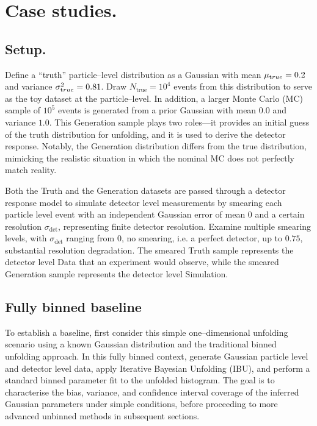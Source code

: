 \section{Case studies.}
\label{sec:case-studies}
    \subsection{Setup.}
    \label{subsec:setup}
        Define a ``truth'' particle--level distribution as a Gaussian with mean $\mu_{\text true}=0.2$ and variance $\sigma^2_{\text true}=0.81$.
        Draw $N_{\text{true}}=10^4$ events from this distribution to serve as the toy dataset at the particle--level.
        In addition, a larger Monte Carlo (MC) sample of $10^5$ events is generated from a prior Gaussian with mean \(0.0\) and variance \(1.0.\)
        This Generation sample plays two roles---it provides an initial guess of the truth distribution for unfolding, and it is used to derive the detector response.
        Notably, the Generation distribution differs from the true distribution, mimicking the realistic situation in which the nominal MC does not perfectly match reality.

        Both the Truth and the Generation datasets are passed through a detector response model to simulate detector level measurements by smearing each particle level event with an independent Gaussian error of mean 0 and a certain resolution $\sigma_{\text{det}}$, representing finite detector resolution.
        Examine multiple smearing levels, with $\sigma_{\text{det}}$ ranging from \(0\), no smearing, i.e. a perfect detector, up to \(0.75\), substantial resolution degradation.
        The smeared Truth sample represents the detector level Data that an experiment would observe, while the smeared Generation sample represents the detector level Simulation.
        
    \subsection{Fully binned baseline}
    \label{subsec:fully_binned_demo}
        To establish a baseline, first consider this simple one--dimensional unfolding scenario using a known Gaussian distribution and the traditional binned unfolding approach.
        In this fully binned context, generate Gaussian particle level and detector level data, apply Iterative Bayesian Unfolding (IBU), and perform a standard binned parameter fit to the unfolded histogram.
        The goal is to characterise the bias, variance, and confidence interval coverage of the inferred Gaussian parameters under simple conditions, before proceeding to more advanced unbinned methods in subsequent sections.
        
